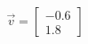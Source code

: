 \documentclass[preview]{standalone}
\begin{document}
\begin{align*}
\vec{v}=\begin{bmatrix}-0.6\\1.8\end{bmatrix}
\end{align*}
\end{document}
